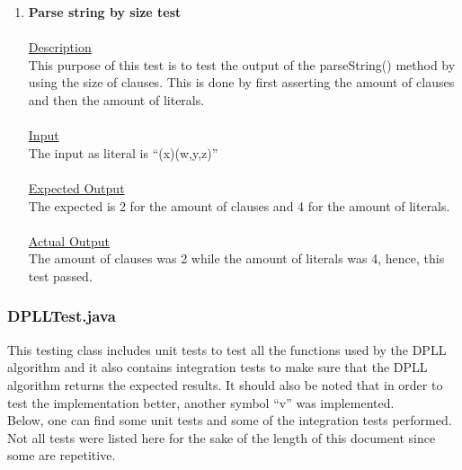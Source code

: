\documentclass{article}
\newcommand{\quotes}[1]{``#1''}
\begin{document}
\begin{enumerate}
				
		\item \textbf{Parse string by size test}\\\\
		\underline{Description}\\
		\indent This purpose of this test is to test the output of the parseString() method by using the size of clauses. This is done by first asserting the amount of clauses and then the amount of literals.\\\\
		\underline{Input}\\
		\indent The input as literal is \quotes{(x)(w,y,z)}\\	\\
		\underline{Expected Output}\\
		\indent The expected is 2 for the amount of clauses and 4 for the amount of literals.\\\\
		\underline{Actual Output}\\
		\indent The amount of clauses was 2 while the amount of literals was 4, hence, this test passed.\\
		
	\end{enumerate}
	
	\subsubsection{DPLLTest.java}
	
	This testing class includes unit tests to test all the functions used by the DPLL algorithm and it also contains integration tests to make sure that the DPLL algorithm returns the expected results. It should also be noted that in order to test the implementation better, another symbol \quotes{v} was implemented.\\
	Below, one can find some unit tests and some of the integration tests performed. Not all tests were listed here for the sake of the length of this document since some are repetitive.
	
\end{document}
